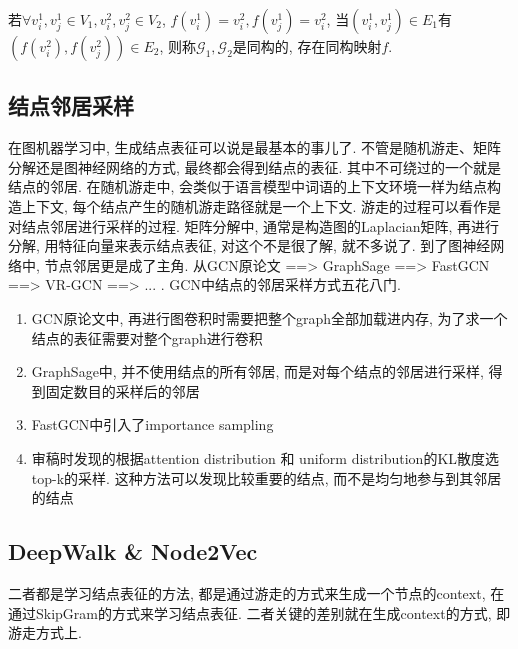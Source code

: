 若$\forall v_i^1, v_j^1 \in V_1, v_i^2, v_j^2 \in V_2$, $f(v_i^1) = v_i^2, f(v_j^1) = v_i^2$, 当$(v_i^1, v_j^1) \in E_1$有$( f(v_i^2), f(v_j^2) ) \in E_2$, 则称$\mathcal{G}_1, \mathcal{G}_2$是同构的, 存在同构映射$f$. 

\subsection{结点邻居采样}
在图机器学习中, 生成结点表征可以说是最基本的事儿了. 不管是随机游走、矩阵分解还是图神经网络的方式, 最终都会得到结点的表征. 其中不可绕过的一个就是结点的邻居. 
在随机游走中, 会类似于语言模型中词语的上下文环境一样为结点构造上下文, 每个结点产生的随机游走路径就是一个上下文. 游走的过程可以看作是对结点邻居进行采样的过程. 矩阵分解中, 通常是构造图的Laplacian矩阵, 再进行分解, 用特征向量来表示结点表征, 对这个不是很了解, 就不多说了. 到了图神经网络中, 节点邻居更是成了主角. 从GCN原论文\cite{kipf2017semi-supervised} ==> GraphSage\cite{hamilton2017inductive} ==> FastGCN\cite{chen2018fastgcn} ==> VR-GCN\cite{chen2018stochastic} ==> ... . GCN中结点的邻居采样方式五花八门. 

\begin{enumerate}
	\item GCN原论文中, 再进行图卷积时需要把整个graph全部加载进内存, 为了求一个结点的表征需要对整个graph进行卷积
	\item GraphSage中, 并不使用结点的所有邻居, 而是对每个结点的邻居进行采样, 得到固定数目的采样后的邻居
	\item FastGCN中引入了importance sampling
	\item 审稿时发现的根据attention distribution 和 uniform distribution的KL散度选top-k的采样. 这种方法可以发现比较重要的结点, 而不是均匀地参与到其邻居的结点
\end{enumerate}

\subsection{DeepWalk \& Node2Vec}
二者都是学习结点表征的方法, 都是通过游走的方式来生成一个节点的context, 在通过SkipGram的方式来学习结点表征. 二者关键的差别就在生成context的方式, 即游走方式上. 

